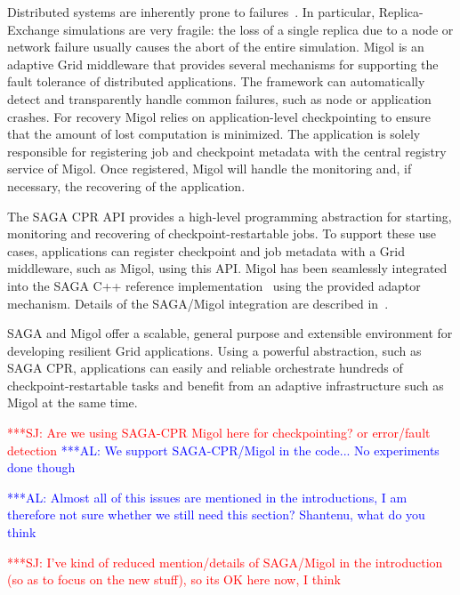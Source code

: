 \documentclass{rspublic}
\newcommand{\alnote}[1]{ {\textcolor{blue} { ***AL: #1 }}}
\newcommand{\jhanote}[1]{ {\textcolor{red} { ***SJ: #1 }}}
\newcommand{\alnote}[1]{}
\newcommand{\jhanote}[1]{}
\begin{document}
Distributed systems are inherently prone to 
failures~\citep{schroeder,10.1109/E-SCIENCE.2006.93}.    
In particular, Replica-Exchange simulations are very fragile: the loss of a single
replica due to a node or network failure usually causes the
abort of the entire simulation. Migol is an adaptive Grid middleware 
that provides several mechanisms for supporting the fault tolerance of 
distributed applications. 
The framework can automatically detect and transparently handle common
failures, such as node or application crashes. For recovery Migol
relies on application-level checkpointing to ensure that the amount of
lost computation is minimized. The application is solely responsible
for registering job and checkpoint metadata with the central registry
service of Migol. Once registered, Migol will handle the monitoring
and, if necessary, the recovering of the application.


The SAGA CPR API provides a high-level programming abstraction for
starting, monitoring and recovering of checkpoint-restartable jobs. To
support these use cases, applications can register checkpoint and job
metadata with a Grid middleware, such as Migol, using this API.
Migol has been seamlessly integrated into the SAGA C++ reference
implementation~\citep{Kaiser:2006qp} using the provided adaptor
mechanism. Details of the SAGA/Migol integration are described
in~\citet{Luckow:2008la}.

SAGA and Migol offer a scalable, general purpose and extensible
environment for developing resilient Grid applications.  Using a
powerful abstraction, such as SAGA CPR, applications can easily and
reliable orchestrate hundreds of checkpoint-restartable tasks and
benefit from an adaptive infrastructure such as Migol at the same
time.

\jhanote{Are we using SAGA-CPR Migol here for checkpointing? or
  error/fault detection} 
\alnote{We support SAGA-CPR/Migol in the code... No experiments done though}  

\alnote{Almost all of this issues are mentioned in the introductions,
  I am therefore not sure whether we still need this section?
  Shantenu, what do you think}

\jhanote{I've kind of reduced mention/details of SAGA/Migol in the
  introduction (so as to focus on the new stuff), so its OK here now,
  I think}
\end{document}
